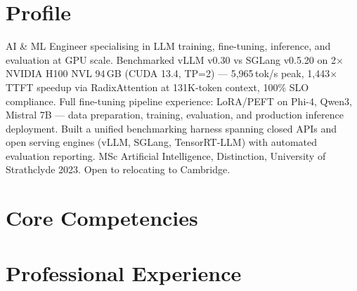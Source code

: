 \documentclass[11pt,a4paper]{moderncv}
\begin{document}
\makecvtitle

\section{Profile}
AI \& ML Engineer specialising in LLM training, fine-tuning, inference, and evaluation at GPU scale. Benchmarked vLLM v0.30 vs SGLang v0.5.20 on 2$\times$ NVIDIA H100 NVL 94\,GB (CUDA 13.4, TP=2) — 5,965\,tok/s peak, 1,443$\times$ TTFT speedup via RadixAttention at 131K-token context, 100\% SLO compliance. Full fine-tuning pipeline experience: LoRA/PEFT on Phi-4, Qwen3, Mistral 7B — data preparation, training, evaluation, and production inference deployment. Built a unified benchmarking harness spanning closed APIs and open serving engines (vLLM, SGLang, TensorRT-LLM) with automated evaluation reporting. MSc Artificial Intelligence, Distinction, University of Strathclyde 2023. Open to relocating to Cambridge.

\section{Core Competencies}

\section{Professional Experience}
\end{document}
